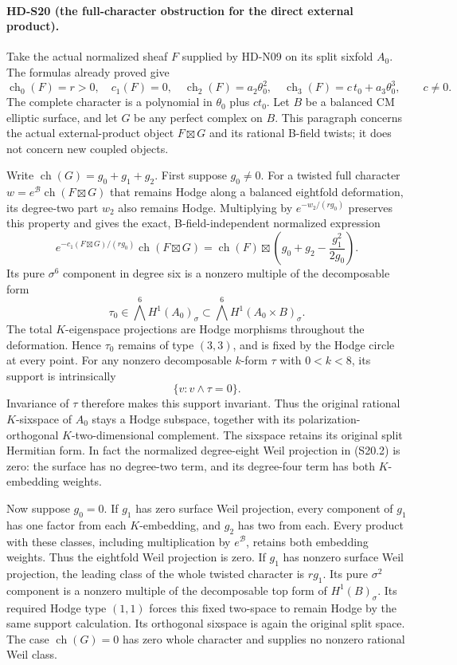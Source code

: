 \paragraph{HD-S20 (the full-character obstruction for the direct external product).}
Take the actual normalized sheaf \(F\) supplied by HD-N09 on its
split sixfold \(A_0\). The formulas already proved give
\[
 \operatorname{ch}_0(F)=r>0,\quad c_1(F)=0,\quad
 \operatorname{ch}_2(F)=a_2\theta_0^2,\quad
 \operatorname{ch}_3(F)=c\,t_0+a_3\theta_0^3,
 \qquad c\ne0.                                           \tag{S20.1}
\]
The complete character is a polynomial in \(\theta_0\) plus
\(ct_0\). Let \(B\) be a balanced CM elliptic surface, and let
\(G\) be any perfect complex on \(B\). This paragraph concerns
the actual external-product object \(F\boxtimes G\) and its
rational B-field twists; it does not concern new coupled objects.

Write \(\operatorname{ch}(G)=g_0+g_1+g_2\). First suppose
\(g_0\ne0\). For a twisted full character
\(w=e^{\mathcal B}\operatorname{ch}(F\boxtimes G)\) that
remains Hodge along a balanced eightfold deformation, its
degree-two part \(w_2\) also remains Hodge. Multiplying by
\(e^{-w_2/(rg_0)}\) preserves this property and gives the
exact, B-field-independent normalized expression
\[
 e^{-c_1(F\boxtimes G)/(rg_0)}
       \operatorname{ch}(F\boxtimes G)
 =\operatorname{ch}(F)\boxtimes
       \left(g_0+g_2-\frac{g_1^2}{2g_0}\right).          \tag{S20.2}
\]
Its pure \(\sigma^6\) component in degree six is a nonzero
multiple of the decomposable form
\[
 \tau_0\in\bigwedge^6H^1(A_0)_\sigma
       \subset\bigwedge^6H^1(A_0\times B)_\sigma.
\]
The total \(K\)-eigenspace projections are Hodge morphisms
throughout the deformation. Hence \(\tau_0\) remains of type
\((3,3)\), and is fixed by the Hodge circle at every point.
For any nonzero decomposable \(k\)-form \(\tau\) with
\(0<k<8\), its support is intrinsically
\[
 \{v:v\wedge\tau=0\}.
\]
Invariance of \(\tau\) therefore makes this support invariant.
Thus the original rational \(K\)-sixspace of \(A_0\) stays a
Hodge subspace, together with its polarization-orthogonal
\(K\)-two-dimensional complement. The sixspace retains its
original split Hermitian form. In fact the normalized degree-eight
Weil projection in (S20.2) is zero: the surface has no degree-two
term, and its degree-four term has both \(K\)-embedding weights.

Now suppose \(g_0=0\). If \(g_1\) has zero surface Weil
projection, every component of \(g_1\) has one factor from
each \(K\)-embedding, and \(g_2\) has two from each.
Every product with these classes, including multiplication by
\(e^{\mathcal B}\), retains both embedding weights. Thus the
eightfold Weil projection is zero. If \(g_1\) has nonzero
surface Weil projection, the leading class of the whole
twisted character is \(rg_1\). Its pure \(\sigma^2\)
component is a nonzero multiple of the decomposable top form
of \(H^1(B)_\sigma\). Its required Hodge type \((1,1)\)
forces this fixed two-space to remain Hodge by the same support
calculation. Its orthogonal sixspace is again the original
split space. The case \(\operatorname{ch}(G)=0\) has zero
whole character and supplies no nonzero rational Weil class.

